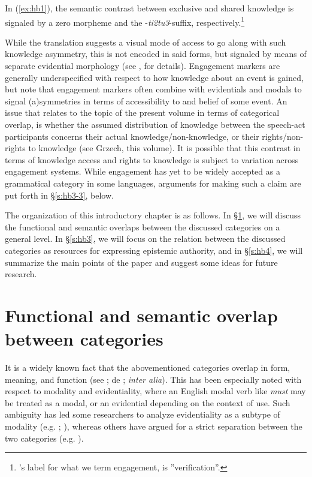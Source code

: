 \documentclass[output=paper]{langsci/langscibook}
\begin{document}
In (\ref{ex:hb1}), the semantic contrast between exclusive and shared knowledge is signaled by a zero morpheme and the -\textit{ti2tu3}-suffix, respectively.\footnote{\citeauthor{Kroeker2001}’s label for what we term engagement, is ”verification”.}

While the translation suggests a visual mode of access to go along with such knowledge asymmetry, this is not encoded in said forms, but signaled by means of separate evidential morphology (see \citealt{Kroeker2001}, for details).
Engagement markers are generally underspecified with respect to how knowledge about an event is gained, but \cite{Evansetal2017b} note that engagement markers often combine with evidentials and modals to signal (a)symmetries in terms of accessibility to and belief of some event. An issue that relates to the topic of the present volume in terms of categorical overlap, is whether the assumed distribution of knowledge between the speech-act participants concerns their actual knowledge/non-knowledge, or their rights/non-rights to knowledge (see Grzech, this volume).
It is possible that this contrast in terms of knowledge access and rights to knowledge is subject to variation across engagement systems. While engagement has yet to be widely accepted as a grammatical category in some languages, arguments for making such a claim are put forth in §\ref{s:hb3-3}, below. 

The organization of this introductory chapter is as follows. In §\ref{s:hb2}, we will discuss the functional and semantic overlaps between the discussed categories on a general level. In §\ref{s:hb3}, we will focus on the relation between the discussed categories as resources for expressing epistemic authority, and in §\ref{s:hb4}, we will summarize the main points of the paper and suggest some ideas for future research.

\section{Functional and semantic overlap between categories}\label{s:hb2}
 
It is a widely known fact that the abovementioned categories overlap in form, meaning, and function (see \citealt{Cornillie2009}; de \citealt{Haan1999}; \emph{inter alia}). This has been especially noted with respect to modality and evidentiality, where an English modal verb like \emph{must} may be treated as a modal, or an evidential depending on the context of use. Such ambiguity has led some researchers to analyze evidentiality as a subtype of modality (e.g. \citealt{Palmer1986}; \citealt{Palmer2001}), whereas others have argued for a strict separation between the two categories (e.g. \citealt{Aikhenvald2004}).
\end{document}
